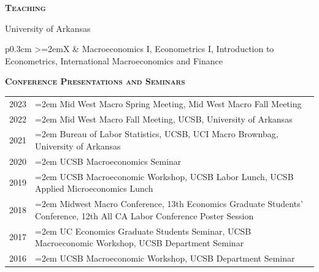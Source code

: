 \documentclass[11pt]{article}
\newenvironment{rSection}[1]{ %
  {\large\bf\textsc{#1}}
  \vspace{0.15cm}
  \begin{list}{}{ %
    \setlength{\leftmargin}{1.5em} %
    \setlength{\rightmargin}{1.5em}
  }
  \item[]
}{
  \end{list}
  \vspace{0.15cm}
}
\begin{document}
\begin{rSection}{Teaching}
University of Arkansas\\
\begin{tabularx}{\linewidth}{p{0.3cm} >{\hangindent=2em}X}
& Macroeconomics I, Econometrics I, Introduction to Econometrics, International Macroeconomics and Finance\\[0.3cm]
\end{tabularx}
\end{rSection}

\begin{rSection}{Conference Presentations and Seminars}
\begin{tabularx}{\linewidth}{l >{\hangindent=2em}X}
2023 & Mid West Macro Spring Meeting, Mid West Macro Fall Meeting\\
2022 & Mid West Macro Fall Meeting, UCSB, University of Arkansas\\
2021 & Bureau of Labor Statistics, UCSB, UCI Macro Brownbag, University of Arkansas \\
2020 & UCSB Macroeconomics Seminar\\
2019 & UCSB Macroeconomic Workshop, UCSB Labor Lunch, UCSB Applied Microeconomics Lunch\\
2018 & Midwest Macro Conference, 13th Economics Graduate Students' Conference, 12th All CA Labor Conference Poster Session\\
2017 & UC Economics Graduate Students Seminar, UCSB Macroeconomic Workshop, UCSB Department Seminar\\
2016 & UCSB Macroeconomic Workshop, UCSB Department Seminar\\
\end{tabularx}
\end{rSection}
\end{document}
